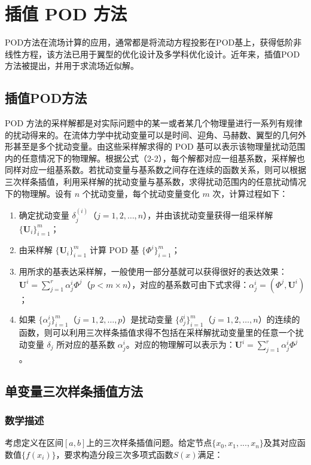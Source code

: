 \chapter{插值 POD 方法}
\label{cha:sysu-thesis-latex-install-guide}
POD方法在流场计算的应用，通常都是将流动方程投影在POD基上，获得低阶非线性方程，该方法已用于翼型的优化设计及多学科优化设计。近年来，插值POD方法被提出，并用于求流场近似解。

\section{插值POD方法}
POD 方法的采样解都是对实际问题中的某一或者某几个物理量进行一系列有规律的扰动得来的。在流体力学中扰动变量可以是时间、迎角、马赫数、翼型的几何外形甚至是多个扰动变量。由这些采样解求得的 POD 基可以表示该物理量扰动范围内的任意情况下的物理解。根据公式（2-2），每个解都对应一组基系数，采样解也同样对应一组基系数。若扰动变量与基系数之间存在连续的函数关系，则可以根据三次样条插值，利用采样解的扰动变量与基系数，求得扰动范围内的任意扰动情况下的物理解。设有 \(n\) 个扰动变量，每个扰动变量变化 \(m\) 次，计算过程如下：
\begin{enumerate}
    \item 确定扰动变量 \(\delta_j^{(i)}\)（\(j = 1, 2, \ldots, n\)），并由该扰动变量获得一组采样解 \(\{\mathbf{U}_i\}_{i=1}^m\)；
    \item 由采样解 \(\{\mathbf{U}_i\}_{i=1}^m\) 计算 POD 基 \(\{\Phi^i\}_{i=1}^m\)；
    \item 用所求的基表达采样解，一般使用一部分基就可以获得很好的表达效果：\(\mathbf{U}^i = \sum_{j=1}^r \alpha_j^i \Phi^j\)（\(p < m \times n\)），对应的基系数可由下式求得：\(\alpha_j^i = (\Phi^j, \mathbf{U}^i)\)；
    \item 如果 \(\{\alpha_j^i\}_{i=1}^m\)（\(j = 1, 2, \ldots, p\)）是扰动变量 \(\{\delta_j^i\}_{i=1}^m\)（\(j = 1, 2, \ldots, n\)）的连续的函数，则可以利用三次样条插值求得不包括在采样解扰动变量里的任意一个扰动变量 \(\delta_j\) 所对应的基系数 \(\alpha_j^i\)。对应的物理解可以表示为：\(\mathbf{U}^i = \sum_{j=1}^r \alpha_j^i \Phi^j\)。
\end{enumerate}

\section{单变量三次样条插值方法}
\subsection{数学描述}
考虑定义在区间$[a,b]$上的三次样条插值问题。给定节点$\{x_0,x_1,...,x_n\}$及其对应函数值$\{f(x_i)\}$，要求构造分段三次多项式函数$S(x)$满足：

